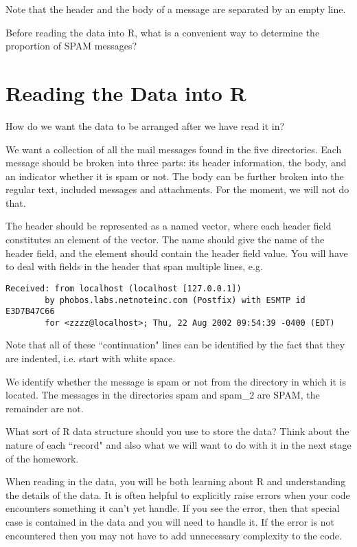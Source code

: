 \documentclass[10pt]{article}
\def\SPAM{SPAM}
\begin{document}
Note that the header and the body of a message are separated by an
empty line.


Before reading the data into R, what is a convenient way to determine
the proportion of \SPAM{} messages?


\section{Reading the Data into R}
How do we want the data to be arranged after we have read it in?

We want a collection of all the mail messages found in the five directories.
Each message should be broken into three parts: its header information, the body,
and an indicator whether it is spam or not.  The body can be further broken
into the regular text, included messages and attachments. For the
moment, we will not do that.

The header should be represented as a named vector, where each
header field constitutes an element of the vector.  The name should
give the name of the header field, and the element should contain the header
field value.
You will have to deal with fields in the header that
span multiple lines, e.g.

\begin{verbatim}
Received: from localhost (localhost [127.0.0.1])
        by phobos.labs.netnoteinc.com (Postfix) with ESMTP id E3D7B47C66
        for <zzzz@localhost>; Thu, 22 Aug 2002 09:54:39 -0400 (EDT)
\end{verbatim}

Note that all of these ``continuation" lines can be identified
by the fact that they are indented, i.e. start with white space.

We identify whether the message is spam or not from the directory in
which it is located.  The messages in the directories spam and spam\_2
are \SPAM, the remainder are not.


What sort of R data structure should you use to store the data?
Think about the nature of each ``record" and also what we will
want to do with it in the next stage of the homework.

When reading in the data, you will be both learning about R and 
understanding the details of the data.  It is often helpful to
explicitly raise errors when your code encounters something it can't
yet handle.  If you see the error, then that special case is contained
in the data and you will need to handle it.  If the error is not 
encountered then you may not have to add unnecessary complexity to the code.
\end{document}
